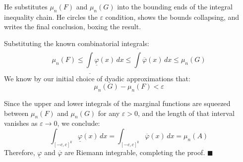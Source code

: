\begin{nice-box}
He substitutes $\mu_n(F)$ and $\mu_n(G)$ into the bounding ends of the integral inequality chain. He circles the $\varepsilon$ condition, shows the bounds collapsing, and writes the final conclusion, boxing the result.
\end{nice-box}

\begin{math-stroke}
Substituting the known combinatorial integrals:
\[
\mu_n(F) \le \underline{\int} \underline{\varphi}(x) \, dx \le \overline{\int} \overline{\varphi}(x) \, dx \le \mu_n(G)
\]
We know by our initial choice of dyadic approximations that:
\[
\mu_n(G) - \mu_n(F) < \varepsilon
\]
\end{math-stroke}

\begin{orange-formula}
\begin{theorem}
Since the upper and lower integrals of the marginal functions are squeezed between $\mu_n(F)$ and $\mu_n(G)$ for any $\varepsilon > 0$, and the length of that interval vanishes as $\varepsilon \to 0$, we conclude:
\[
\int_{[-c,c]^k} \underline{\varphi}(x) \, dx = \int_{[-c,c]^k} \overline{\varphi}(x) \, dx = \mu_n(A)
\]
Therefore, $\underline{\varphi}$ and $\overline{\varphi}$ are Riemann integrable, completing the proof. $\blacksquare$
\end{theorem}
\end{orange-formula}
